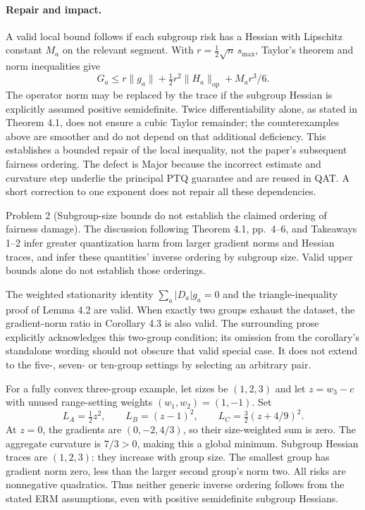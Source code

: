 \documentclass[10pt]{article}
\begin{document}
\paragraph*{Repair and impact.}\mbox{}\par
A valid local bound follows if each subgroup risk has a Hessian with Lipschitz constant \(M_a\) on the relevant segment. With \(r=\frac12\sqrt n\,s_{\max}\), Taylor’s theorem and norm inequalities give \[G_a\le r\|g_a\|+\tfrac12r^2\|H_a\|_{\mathrm{op}}+M_ar^3/6.\] The operator norm may be replaced by the trace if the subgroup Hessian is explicitly assumed positive semidefinite. Twice differentiability alone, as stated in Theorem 4.1, does not ensure a cubic Taylor remainder; the counterexamples above are smoother and do not depend on that additional deficiency. This establishes a bounded repair of the local inequality, not the paper’s subsequent fairness ordering. The defect is Major because the incorrect estimate and curvature step underlie the principal PTQ guarantee and are reused in QAT. A short correction to one exponent does not repair all these dependencies.\par
Problem 2 (Subgroup-size bounds do not establish the claimed ordering of fairness damage).  The discussion following Theorem 4.1, pp. 4–6, and Takeaways 1–2 infer greater quantization harm from larger gradient norms and Hessian traces, and infer these quantities’ inverse ordering by subgroup size. Valid upper bounds alone do not establish those orderings.\par
The weighted stationarity identity \(\sum_a |D_a|g_a=0\) and the triangle-inequality proof of Lemma 4.2 are valid. When exactly two groups exhaust the dataset, the gradient-norm ratio in Corollary 4.3 is also valid. The surrounding prose explicitly acknowledges this two-group condition; its omission from the corollary’s standalone wording should not obscure that valid special case. It does not extend to the five-, seven- or ten-group settings by selecting an arbitrary pair.\par
For a fully convex three-group example, let sizes be \((1,2,3)\) and let \(z=w_3-c\) with unused range-setting weights \((w_1,w_2)=(1,-1)\). Set \[L_A=\tfrac12z^2,\qquad L_B=(z-1)^2,\qquad
 L_C=\tfrac32(z+4/9)^2.\] At \(z=0\), the gradients are \((0,-2,4/3)\), so their size-weighted sum is zero. The aggregate curvature is \(7/3>0\), making this a global minimum. Subgroup Hessian traces are \((1,2,3)\): they increase with group size. The smallest group has gradient norm zero, less than the larger second group’s norm two. All risks are nonnegative quadratics. Thus neither generic inverse ordering follows from the stated ERM assumptions, even with positive semidefinite subgroup Hessians.\par
\end{document}
